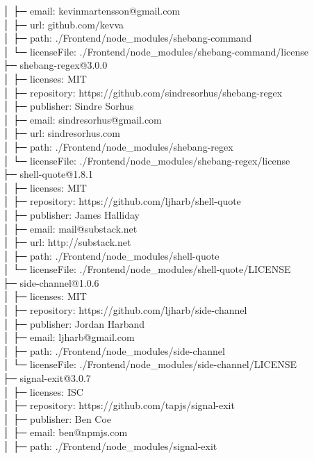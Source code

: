 │  ├─ email: kevinmartensson@gmail.com\\
│  ├─ url: github.com/kevva\\
│  ├─ path: ./Frontend/node\_modules/shebang-command\\
│  └─ licenseFile: ./Frontend/node\_modules/shebang-command/license\\
├─ shebang-regex@3.0.0\\
│  ├─ licenses: MIT\\
│  ├─ repository: https://github.com/sindresorhus/shebang-regex\\
│  ├─ publisher: Sindre Sorhus\\
│  ├─ email: sindresorhus@gmail.com\\
│  ├─ url: sindresorhus.com\\
│  ├─ path: ./Frontend/node\_modules/shebang-regex\\
│  └─ licenseFile: ./Frontend/node\_modules/shebang-regex/license\\
├─ shell-quote@1.8.1\\
│  ├─ licenses: MIT\\
│  ├─ repository: https://github.com/ljharb/shell-quote\\
│  ├─ publisher: James Halliday\\
│  ├─ email: mail@substack.net\\
│  ├─ url: http://substack.net\\
│  ├─ path: ./Frontend/node\_modules/shell-quote\\
│  └─ licenseFile: ./Frontend/node\_modules/shell-quote/LICENSE\\
├─ side-channel@1.0.6\\
│  ├─ licenses: MIT\\
│  ├─ repository: https://github.com/ljharb/side-channel\\
│  ├─ publisher: Jordan Harband\\
│  ├─ email: ljharb@gmail.com\\
│  ├─ path: ./Frontend/node\_modules/side-channel\\
│  └─ licenseFile: ./Frontend/node\_modules/side-channel/LICENSE\\
├─ signal-exit@3.0.7\\
│  ├─ licenses: ISC\\
│  ├─ repository: https://github.com/tapjs/signal-exit\\
│  ├─ publisher: Ben Coe\\
│  ├─ email: ben@npmjs.com\\
│  ├─ path: ./Frontend/node\_modules/signal-exit\\
